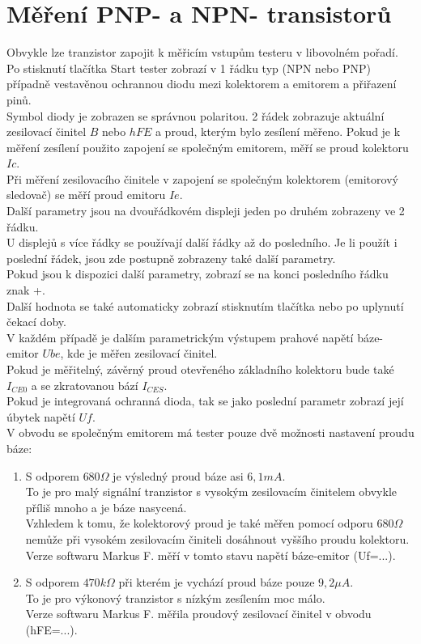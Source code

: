 \section{Měření PNP- a NPN- transistorů}
Obvykle lze tranzistor zapojit k měřicím vstupům testeru v libovolném pořadí.\\
Po stisknutí tlačítka Start tester zobrazí v 1 řádku  typ (NPN nebo PNP) případně vestavěnou ochrannou
diodu mezi kolektorem a emitorem a přiřazení pinů.\\
Symbol diody je zobrazen se správnou polaritou.
2 řádek zobrazuje aktuální zesilovací činitel \(B\) nebo \(hFE\) a proud, kterým bylo zesílení měřeno. 
Pokud je k měření zesílení použito zapojení se společným emitorem, měří se proud kolektoru \(Ic\).\\
Při měření zesilovacího činitele v zapojení se společným kolektorem (emitorový sledovač) se měří proud emitoru \(Ie\).\\
Další parametry jsou na dvouřádkovém displeji jeden po druhém zobrazeny ve 2 řádku.\\
U displejů s více řádky se používají další řádky až do posledního. Je li použít i poslední řádek, jsou zde postupně zobrazeny také další parametry.\\
Pokud jsou k dispozici další parametry, zobrazí se na konci posledního řádku znak +.\\
Další hodnota se také automaticky zobrazí stisknutím tlačítka nebo po uplynutí čekací doby.\\
V každém případě je dalším parametrickým výstupem prahové napětí báze-emitor \(Ube\),
kde je měřen zesilovací činitel.\\
Pokud je měřitelný, závěrný proud otevřeného základního kolektoru bude také \(I_{CE0}\) a se
zkratovanou bází \(I_{CES}\).\\
Pokud je integrovaná ochranná dioda, tak se jako poslední parametr zobrazí její úbytek napětí \(Uf\).\\

V obvodu se společným emitorem má tester pouze dvě možnosti nastavení proudu báze:
\begin{enumerate}
\item S odporem \(680\Omega\) je výsledný proud báze asi \(6,1mA\).\\
To je pro malý signální tranzistor s vysokým zesilovacím činitelem obvykle příliš mnoho a je báze nasycená.\\
Vzhledem k tomu, že kolektorový proud je také měřen pomocí odporu \(680\Omega\) nemůže při vysokém zesilovacím činiteli dosáhnout vyššího proudu kolektoru.\\
Verze softwaru Markus F. měří v tomto stavu napětí báze-emitor (Uf=...).
\item S odporem \(470k\Omega\) při kterém je vychází proud báze pouze \(9,2\mu A\).\\
To je pro výkonový tranzistor s nízkým zesílením moc málo.\\
Verze softwaru Markus F. měřila proudový zesilovací činitel v obvodu (hFE=...).\\
\end{enumerate}

